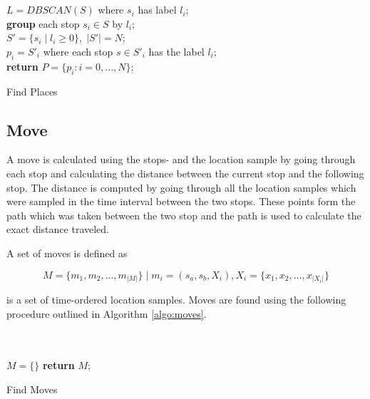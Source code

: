 \begin{algorithm}[H]
\SetAlgoLined
{}\\
\\
    $L = DBSCAN(S)$ where $s_i$ has label $l_i$;\\
    \textbf{group} each stop $s_i \in S$ by $l_i$;\\
    $S' = \{s_i \;|\; l_i \geq 0\}, \;|S'| = N$;\\
    $p_i = S'_i$ where each stop $s \in S'_i$ has the label $l_i$;\\
    \textbf{return} $P = \{p_i : i = 0, ..., N\}$;\\
 \label{algo:places}
 \caption{Find Places}
\end{algorithm}

\subsection{Move}
A move is calculated using the stops- and the location sample by going through each stop and calculating the distance between the current stop and the following stop. The distance is computed by going through all the location samples which were sampled in the time interval between the two stops. These points form the path which was taken between the two stop and the path is used to calculate the exact distance traveled.

A set of moves is defined as 

\begin{equation}
\label{eq:feature-moves}
M = \{m_1, m_2, ..., m_{|M|}\} \;| \; m_i = (s_a, s_b, X_i), X_i = \{x_1, x_2, ..., x_{|X_i|}\}
\end{equation}

is a set of time-ordered location samples. Moves are found using the following procedure outlined in Algorithm \ref{algo:moves}.

\begin{algorithm}[H]
\SetAlgoLined
{}\\
\\
    $M = \{ \}$\;
    \textbf{return} $M$;
 \label{algo:moves}
 \caption{Find Moves}
\end{algorithm}


